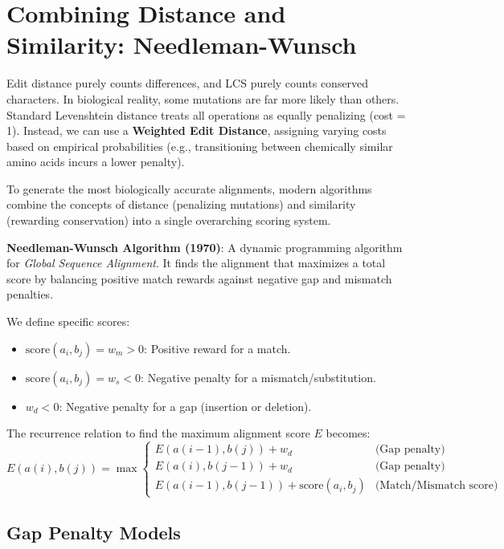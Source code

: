 \section{Combining Distance and Similarity: Needleman-Wunsch}

Edit distance purely counts differences, and LCS purely counts conserved characters. In biological reality, some mutations are far more likely than others. Standard Levenshtein distance treats all operations as equally penalizing (cost = 1). Instead, we can use a \textbf{Weighted Edit Distance}, assigning varying costs based on empirical probabilities (e.g., transitioning between chemically similar amino acids incurs a lower penalty).

To generate the most biologically accurate alignments, modern algorithms combine the concepts of distance (penalizing mutations) and similarity (rewarding conservation) into a single overarching scoring system. 

\begin{important}
    \textbf{Needleman-Wunsch Algorithm (1970)}: A dynamic programming algorithm for \textit{Global Sequence Alignment}. It finds the alignment that maximizes a total score by balancing positive match rewards against negative gap and mismatch penalties.
\end{important}

We define specific scores:
\begin{itemize}
    \item \(\text{score}(a_i, b_j) = w_m > 0\): Positive reward for a match.
    \item \(\text{score}(a_i, b_j) = w_s < 0\): Negative penalty for a mismatch/substitution.
    \item \(w_d < 0\): Negative penalty for a gap (insertion or deletion).
\end{itemize}

The recurrence relation to find the maximum alignment score \(E\) becomes:
\begin{equation}
E(a(i), b(j)) = \max 
\begin{cases} 
E(a(i-1), b(j)) + w_d & \text{(Gap penalty)} \\
E(a(i), b(j-1)) + w_d & \text{(Gap penalty)} \\
E(a(i-1), b(j-1)) + \text{score}(a_i, b_j) & \text{(Match/Mismatch score)}
\end{cases}
\end{equation}

\subsection{Gap Penalty Models}

